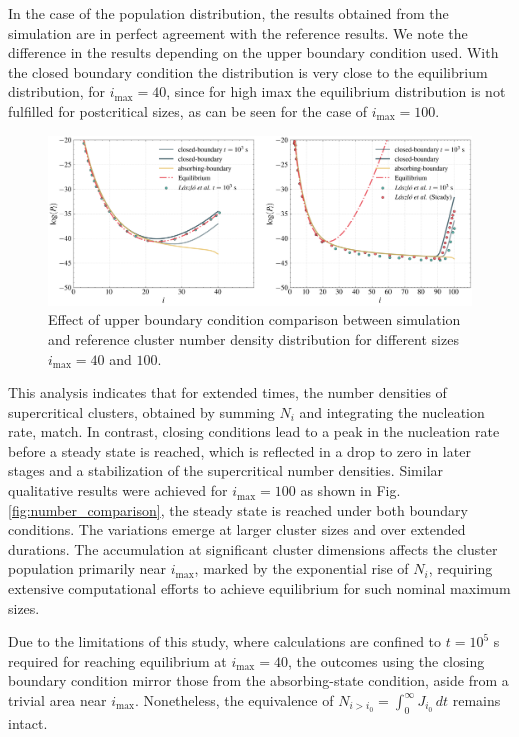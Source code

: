 In the case of the population distribution, the results obtained from the simulation are in perfect agreement with the reference results. 
We note the difference in the results depending on the upper boundary condition used. With the closed boundary condition the distribution is very close to the 
equilibrium distribution, for $i_{\text{max}} = 40$, since for high imax the equilibrium distribution is not fulfilled for postcritical sizes, 
as can be seen for the case of $i_{\text{max}} = 100$. 
\begin{figure}[H]
    \centering
    \hspace*{-2cm} %
    \includegraphics[width=1.2\linewidth]{laszlo_results/number_distribution.png}
    \caption{Effect of upper boundary condition comparison between simulation and reference cluster number density distribution for different sizes $i_{\text{max}} = 40$ and $100$.}
    \label{fig:number_distribution}
\end{figure}

This analysis indicates that for extended times, the number densities of supercritical clusters, obtained by summing $N_i$ and integrating the nucleation rate, match. 
In contrast, closing conditions lead to a peak in the nucleation rate before a steady state is reached, which is reflected in a drop to zero in later stages and a 
stabilization of the supercritical number densities.
Similar qualitative results were achieved for $i_{\max} = 100$ as shown in Fig. \ref{fig:number_comparison}, the steady state is reached under both boundary conditions. 
The variations emerge at larger cluster sizes and over extended durations. The accumulation at significant cluster dimensions affects the cluster population primarily 
near $i_{\max}$, marked by the exponential rise of $N_i$, requiring extensive computational efforts to achieve equilibrium for such nominal maximum sizes.

Due to the limitations of this study, where calculations are confined to $t = 10^5$ s required for reaching 
equilibrium at $i_{\max}=40$, the outcomes using the 
closing boundary condition mirror those from the absorbing-state condition, aside from a trivial area near $i_{\max}$. Nonetheless, the equivalence 
of $ N_{i > i_0} = \int_{0}^{\infty} J_{i_0} \, dt$ remains intact.

